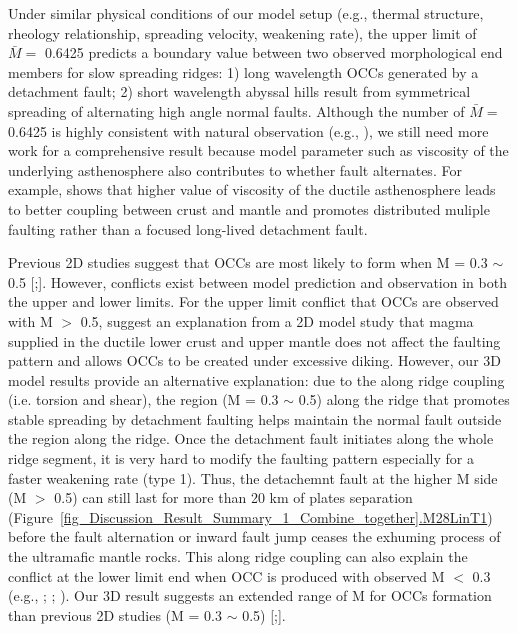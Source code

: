 Under similar physical conditions of our model setup (e.g., thermal structure, rheology relationship, spreading velocity, weakening rate), the upper limit of $\bar{M} = $ 0.6425 predicts a boundary value between two observed morphological end members for slow spreading ridges: 1) long wavelength OCCs generated by a detachment fault; 2) short wavelength abyssal hills result from symmetrical spreading of alternating high angle normal faults. Although the number of $\bar{M} = $ 0.6425 is highly consistent with natural observation (e.g., \citep{MacLeod2009}), we still need more work for a comprehensive result because model parameter such as viscosity of the underlying asthenosphere also contributes to whether fault alternates. For example, \citep{Allken2012} shows that higher value of viscosity of the ductile asthenosphere leads to better coupling between crust and mantle and promotes distributed muliple faulting rather than a focused long-lived detachment fault.

Previous 2D studies suggest that OCCs are most likely to form when M = 0.3 $\sim$ 0.5 [\citealp{Buck2005};\citealp{Tucholke2008}]. However, conflicts exist between model prediction and observation in both the upper and lower limits. For the upper limit conflict that OCCs are observed with M $>$ 0.5, \citet{Olive2010} suggest an explanation from a 2D model study that magma supplied in the ductile lower crust and upper mantle does not affect the faulting pattern and allows OCCs to be created under excessive diking. However, our 3D model results provide an alternative explanation: due to the along ridge coupling (i.e. torsion and shear), the region (M = 0.3 $\sim$ 0.5) along the ridge that promotes stable spreading by detachment faulting helps maintain the normal fault outside the region along the ridge. Once the detachment fault initiates along the whole ridge segment, it is very hard to modify the faulting pattern especially for a faster weakening rate (type 1). Thus, the detachemnt fault at the higher M side (M $>$ 0.5) can still last for more than 20 km of plates separation (Figure~\hyperref[fig_Discussion_Result_Summary_1_Combine_together]{\ref{fig_Discussion_Result_Summary_1_Combine_together}.M28LinT1}) before the fault alternation or inward fault jump ceases the exhuming process of the ultramafic mantle rocks. This along ridge coupling can also explain the conflict at the lower limit end when OCC is produced with observed M $<$ 0.3 (e.g., \citealp{Dick2008}; \citealp{Grimes2008}; \citealp{Baines2008}). Our 3D result suggests an extended range of M for OCCs formation than previous 2D studies (M = 0.3 $\sim$ 0.5) [\citealp{Buck2005};\citealp{Tucholke2008}]. 


